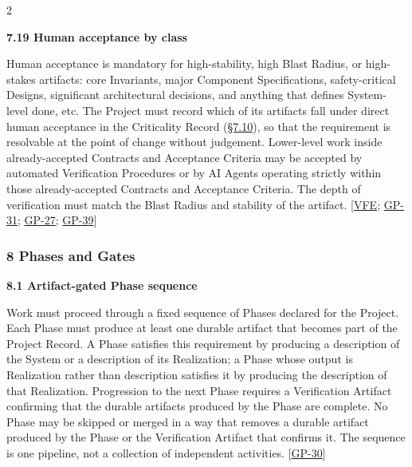 \begin{multicols}{2}
\hypertarget{nss-7.19}{}

\par\smallskip\noindent\textbf{7.19 Human acceptance by class}\par\nopagebreak

Human acceptance is mandatory for high-stability, high Blast Radius, or high-stakes artifacts: core Invariants, major Component Specifications, safety-critical Designs, significant architectural decisions, and anything that defines System-level done, etc. The Project must record which of its artifacts fall under direct human acceptance in the Criticality Record (\hyperlink{nss-7.10}{\S7.10}), so that the requirement is resolvable at the point of change without judgement. Lower-level work inside already-accepted Contracts and Acceptance Criteria may be accepted by automated Verification Procedures or by AI Agents operating strictly within those already-accepted Contracts and Acceptance Criteria. The depth of verification must match the Blast Radius and stability of the artifact. [\hyperlink{gp-VFE}{VFE}; \hyperlink{gp-31}{GP-31}; \hyperlink{gp-27}{GP-27}; \hyperlink{gp-39}{GP-39}]

\hypertarget{nss-8}{}

\subsubsection*{8 Phases and Gates}

\hypertarget{nss-8.1}{}

\par\smallskip\noindent\textbf{8.1 Artifact-gated Phase sequence}\par\nopagebreak

Work must proceed through a fixed sequence of Phases declared for the Project. Each Phase must produce at least one durable artifact that becomes part of the Project Record. A Phase satisfies this requirement by producing a description of the System or a description of its Realization; a Phase whose output is Realization rather than description satisfies it by producing the description of that Realization. Progression to the next Phase requires a Verification Artifact confirming that the durable artifacts produced by the Phase are complete. No Phase may be skipped or merged in a way that removes a durable artifact produced by the Phase or the Verification Artifact that confirms it. The sequence is one pipeline, not a collection of independent activities. [\hyperlink{gp-30}{GP-30}]


\end{multicols}
